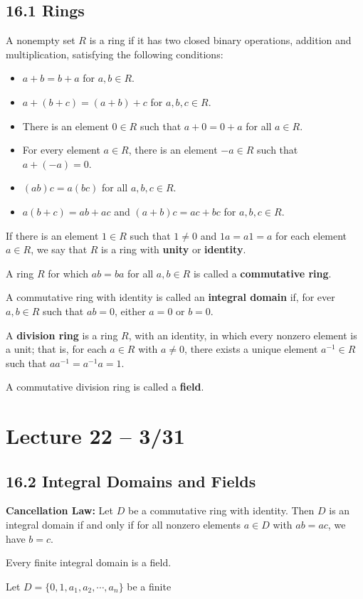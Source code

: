 \documentclass{article}
\begin{document}
\subsection{16.1 Rings}
A nonempty set $R$ is a ring if it has two closed binary operations, addition and multiplication, satisfying the following conditions:
\begin{itemize}
  \item $a+b=b+a$ for $a,b\in R$.
  \item $a+(b+c)=(a+b)+c$ for $a,b,c\in R$.
  \item There is an element $0\in R$ such that $a+0=0+a$ for all $a\in R$.
  \item For every element $a\in R$, there is an element $-a\in R$ such that $a+(-a)=0$.
  \item $(ab)c=a(bc)$ for all $a,b,c\in R$.
  \item $a(b+c)=ab+ac$ and $(a+b)c=ac+bc$ for $a,b,c\in R$.
\end{itemize}

If there is an element $1\in R$ such that $1\neq0$ and $1a=a1=a$ for each element $a\in R$, we say that $R$ is a ring with \textbf{unity} or \textbf{identity}.

A ring $R$ for which $ab=ba$ for all $a,b\in R$ is called a \textbf{commutative ring}.

A commutative ring with identity is called an \textbf{integral domain} if, for ever $a,b\in R$ such that $ab=0$, either $a=0$ or $b=0$.

A \textbf{division ring} is a ring $R$, with an identity, in which every nonzero element is a unit; that is, for each $a\in R$ with $a\neq0$, there exists a unique element $a^{-1}\in R$ such that $aa^{-1}=a^{-1}a=1$.

A commutative division ring is called a \textbf{field}.

\section{Lecture 22 -- 3/31}
\subsection{16.2 Integral Domains and Fields}
\textbf{Cancellation Law:} Let $D$ be a commutative ring with identity. Then $D$ is an integral domain if and only if for all nonzero elements $a\in D$ with $ab=ac$, we have $b=c$.
\begin{theorem}
  Every finite integral domain is a field.

  Let $D=\{0,1,a_1,a_2,\cdots,a_n\}$ be a finite
\end{theorem}
\end{document}
